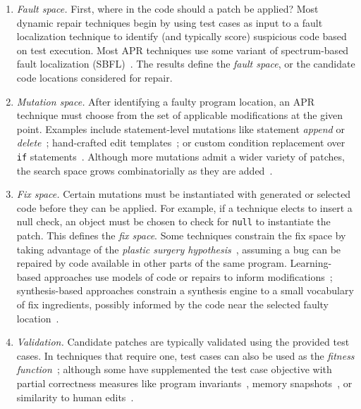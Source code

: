 \documentclass[10pt, conference]{IEEEtran}
\begin{document}
\begin{enumerate}[wide]

\item \emph{Fault space.} First, where 
  in the code should a patch be applied? Most dynamic repair
  techniques begin by using test cases as input to a fault localization
  technique to identify (and typically score) suspicious code
  based on test execution. Most APR techniques
  use some variant of spectrum-based fault localization (SBFL)~\cite{ochiai}. 
  The results define the \emph{fault space}, or the
  candidate code locations considered for repair.

\item \emph{Mutation space.} After identifying a faulty program location, an APR
  technique must choose from the set of applicable modifications at the given
  point. Examples include statement-level mutations like statement \emph{append}
  or \emph{delete}~\cite{genprog-operators}; hand-crafted edit
  templates~\cite{par}; or custom condition
  replacement over \texttt{if} statements~\cite{Xuan17}. Although more mutations
  admit a wider variety of patches, the search space grows combinatorially as
  they are added~\cite{long-search-spaces}.

\item \emph{Fix space.} Certain mutations must be instantiated with generated or
  selected code before they can be applied. For example, if a technique elects
  to insert a null check, an object must be chosen to check for 
  \texttt{null} to instantiate the patch. This defines
  the \emph{fix space}. Some techniques
  constrain the fix space by taking advantage of the \emph{plastic surgery
    hypothesis}~\cite{plastic}, assuming a bug can be repaired by code
  available in other parts of the same program. Learning-based
  approaches use models of code or repairs to inform
  modifications~\cite{prophet}; synthesis-based approaches constrain a
  synthesis engine to a small vocabulary of fix ingredients, possibly informed
  by the code near the selected faulty location~\cite{angelix,s3}.

\item \emph {Validation.}
Candidate patches are typically
validated using the provided test cases. In techniques
that require one, test cases can also be used as the \emph{fitness
  function}~\cite{genprog}; although some have supplemented the test case
objective with partial correctness measures like program
invariants~\cite{dinglyu}, memory snapshots~\cite{source-code-checkpoint}, or
similarity to human edits~\cite{hdrepair}.

\end{enumerate}
\end{document}
